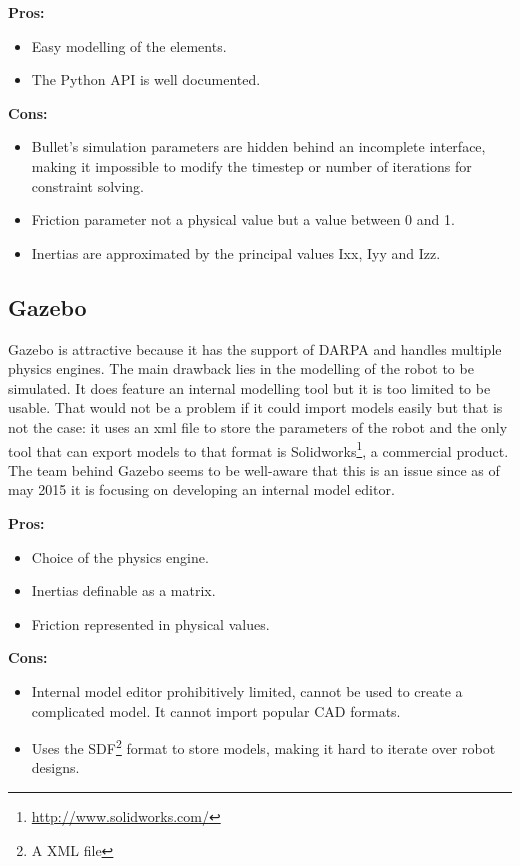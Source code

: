 \textbf{Pros:}
\begin{itemize}
\item Easy modelling of the elements.
\item The Python API is well documented.
\end{itemize}

\textbf{Cons:}
\begin{itemize}
\item Bullet's simulation parameters are hidden behind an incomplete interface, making it impossible to modify the timestep or number of iterations for constraint solving.
\item Friction parameter not a physical value but a value between 0 and 1.
\item Inertias are approximated by the principal values Ixx, Iyy and Izz.
\end{itemize}

\subsection{Gazebo}
Gazebo is attractive because it has the support of DARPA and handles multiple physics engines. The main drawback lies in the modelling of the robot to be simulated. It does feature an internal modelling tool but it is too limited to be usable. That would not be a problem if it could import models easily but that is not the case: it uses an xml file to store the parameters of the robot and the only tool that can export models to that format is Solidworks\footnote{\url{http://www.solidworks.com/}}, a commercial product. The team behind Gazebo seems to be well-aware that this is an issue since as of may 2015 it is focusing on developing an internal model editor.

\textbf{Pros:}
\begin{itemize}
\item Choice of the physics engine.
\item Inertias definable as a matrix.
\item Friction represented in physical values.
\end{itemize}

\textbf{Cons:}
\begin{itemize}
\item Internal model editor prohibitively limited, cannot be used to create a complicated model. It cannot import popular CAD formats.
\item Uses the SDF\footnote{A XML file} format to store models, making it hard to iterate over robot designs.
\end{itemize}

